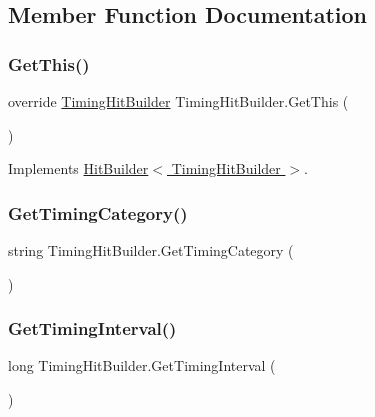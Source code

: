 \subsection{Member Function Documentation}
\mbox{\label{class_timing_hit_builder_a2a40227ad34afd876afb06c316d5d00a}} 
\subsubsection{\texorpdfstring{Get\+This()}{GetThis()}}
{\footnotesize\ttfamily override \hyperlink{class_timing_hit_builder}{Timing\+Hit\+Builder} Timing\+Hit\+Builder.\+Get\+This (\begin{DoxyParamCaption}{ }\end{DoxyParamCaption})\hspace{0.3cm}{\ttfamily [virtual]}}



Implements \hyperlink{class_hit_builder_a4276c57427406e264dc33f8c900ad530}{Hit\+Builder$<$ Timing\+Hit\+Builder $>$}.

\mbox{\label{class_timing_hit_builder_a1096a3db294f47f76e492e4f97d265c9}} 
\subsubsection{\texorpdfstring{Get\+Timing\+Category()}{GetTimingCategory()}}
{\footnotesize\ttfamily string Timing\+Hit\+Builder.\+Get\+Timing\+Category (\begin{DoxyParamCaption}{ }\end{DoxyParamCaption})}

\mbox{\label{class_timing_hit_builder_a952416c97709b9132fcecc61cae0e01d}} 
\subsubsection{\texorpdfstring{Get\+Timing\+Interval()}{GetTimingInterval()}}
{\footnotesize\ttfamily long Timing\+Hit\+Builder.\+Get\+Timing\+Interval (\begin{DoxyParamCaption}{ }\end{DoxyParamCaption})}

